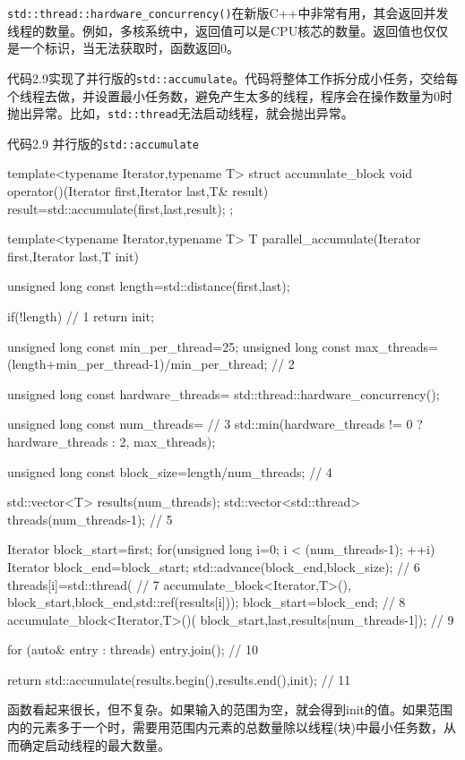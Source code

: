 
\texttt{std::thread::hardware\_concurrency()}在新版C++中非常有用，其会返回并发线程的数量。例如，多核系统中，返回值可以是CPU核芯的数量。返回值也仅仅是一个标识，当无法获取时，函数返回0。

代码2.9实现了并行版的\texttt{std::accumulate}。代码将整体工作拆分成小任务，交给每个线程去做，并设置最小任务数，避免产生太多的线程，程序会在操作数量为0时抛出异常。比如，\texttt{std::thread}无法启动线程，就会抛出异常。

代码2.9 并行版的\texttt{std::accumulate}

\begin{cpp}
template<typename Iterator,typename T>
struct accumulate_block
{
  void operator()(Iterator first,Iterator last,T& result)
  {
    result=std::accumulate(first,last,result);
  }
};

template<typename Iterator,typename T>
T parallel_accumulate(Iterator first,Iterator last,T init)
{
  unsigned long const length=std::distance(first,last);

  if(!length) // 1
    return init;

  unsigned long const min_per_thread=25;
  unsigned long const max_threads=
      (length+min_per_thread-1)/min_per_thread; // 2

  unsigned long const hardware_threads=
      std::thread::hardware_concurrency();

  unsigned long const num_threads=  // 3
      std::min(hardware_threads != 0 ? hardware_threads : 2, max_threads);

  unsigned long const block_size=length/num_threads; // 4

  std::vector<T> results(num_threads);
  std::vector<std::thread> threads(num_threads-1);  // 5

  Iterator block_start=first;
  for(unsigned long i=0; i < (num_threads-1); ++i)
  {
    Iterator block_end=block_start;
    std::advance(block_end,block_size);  // 6
    threads[i]=std::thread(     // 7
        accumulate_block<Iterator,T>(),
        block_start,block_end,std::ref(results[i]));
    block_start=block_end;  // 8
  }
  accumulate_block<Iterator,T>()(
      block_start,last,results[num_threads-1]); // 9

  for (auto& entry : threads)
    entry.join();  // 10

  return std::accumulate(results.begin(),results.end(),init); // 11
}
\end{cpp}

函数看起来很长，但不复杂。如果输入的范围为空，就会得到init的值。如果范围内的元素多于一个时，需要用范围内元素的总数量除以线程(块)中最小任务数，从而确定启动线程的最大数量。

